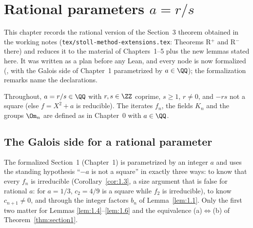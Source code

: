 \chapter{\texorpdfstring{Rational parameters $a = r/s$}{Rational parameters a = r/s}}
\label{chap:rational}

This chapter records the rational version of the Section~3 theorem obtained in the working
notes (\texttt{tex/stoll-method-extensions.tex}: Theorems R${}^+$ and R${}^-$ there) and reduces
it to the material of Chapters~1--5 plus the new lemmas stated here. It was written as a plan
before any Lean, and every node is now formalized (, with the
Galois side of Chapter~1 parametrized by $a \in \QQ$); the formalization remarks name the
declarations.

Throughout, $a = r/s \in \QQ$ with $r, s \in \ZZ$ coprime, $s \ge 1$, $r \ne 0$, and $-rs$ not a
square (else $f = X^2 + a$ is reducible). The iterates $f_n$, the fields $K_n$ and the groups
$\Om_n$ are defined as in Chapter~0 with $a \in \QQ$.

\section{The Galois side for a rational parameter}

The formalized Section~1 (Chapter~1) is parametrized by an integer $a$ and uses the standing
hypothesis ``$-a$ is not a square'' in exactly three ways: to know that every $f_n$ is
irreducible (Corollary~\ref{cor:1.3}, a size argument that is false for rational $a$: for
$a = 1/3$, $c_2 = 4/9$ is a square while $f_2$ is irreducible), to know $c_{n+1} \ne 0$, and
through the integer factors $b_n$ of Lemma~\ref{lem:1.1}. Only the first two matter for Lemmas
\ref{lem:1.4}--\ref{lem:1.6} and the equivalence (a)$\iff$(b) of Theorem~\ref{thm:section1}.

